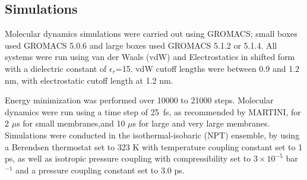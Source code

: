 
\subsection{Simulations}


Molecular dynamics simulations were carried out using GROMACS\cite{grom}; small boxes used GROMACS 5.0.6 and large boxes used  GROMACS 5.1.2 or 5.1.4. All systems were run using van der Waals (vdW) and Electrostatics in shifted form with a dielectric constant of $\epsilon_r$=15. vdW cutoff lengths were between 0.9 and 1.2 nm, with electrostatic cutoff length at 1.2 nm.

Energy minimization was performed over 10000 to 21000 steps.  Molecular dynamics were run using a time step of 25~fs, as recommended by MARTINI, for 2 $\mu$s for {small membranes,and 10 $\mu$s for large and very large membranes}. Simulations were conducted in the isothermal-isobaric (NPT) ensemble, by using a Berendsen thermostat set to 323 K with temperature coupling constant set to  1 ps, as well as isotropic pressure coupling with compressibility set to $3\times 10^{-5}$ bar$^{-1}$ and a pressure coupling constant set to 3.0 ps. %


